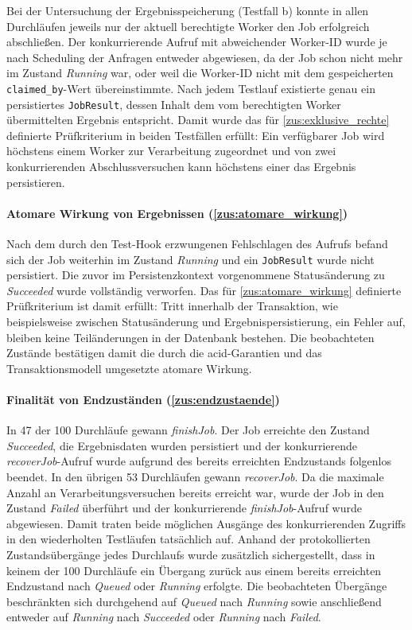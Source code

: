 Bei der Untersuchung der Ergebnisspeicherung (Testfall b) konnte in allen Durchläufen jeweils nur der aktuell
berechtigte Worker den Job erfolgreich abschließen.
Der konkurrierende Aufruf mit abweichender Worker-ID wurde je nach Scheduling der Anfragen entweder abgewiesen, da der
Job schon nicht mehr im Zustand \textit{Running} war, oder weil die Worker-ID nicht mit dem gespeicherten
\texttt{claimed\_by}-Wert übereinstimmte.
Nach jedem Testlauf existierte genau ein persistiertes \texttt{JobResult}, dessen Inhalt dem vom berechtigten Worker
übermittelten Ergebnis entspricht.
Damit wurde das für \ref{zus:exklusive_rechte} definierte Prüfkriterium in beiden Testfällen erfüllt: Ein
verfügbarer Job wird höchstens einem Worker zur Verarbeitung zugeordnet und von zwei konkurrierenden Abschlussversuchen
kann höchstens einer das Ergebnis persistieren.

\paragraph{Atomare Wirkung von Ergebnissen (\ref{zus:atomare_wirkung})}
\label{erg:atomare_wirkung}
Nach dem durch den Test-Hook erzwungenen Fehlschlagen des Aufrufs befand sich der Job weiterhin im Zustand
\textit{Running} und ein \texttt{JobResult} wurde nicht persistiert.
Die zuvor im Persistenzkontext vorgenommene Statusänderung zu \textit{Succeeded} wurde vollständig verworfen.
Das für \ref{zus:atomare_wirkung} definierte Prüfkriterium ist damit erfüllt: Tritt innerhalb der Transaktion, wie beispielsweise
zwischen Statusänderung und Ergebnispersistierung, ein Fehler auf, bleiben keine Teiländerungen in der Datenbank bestehen.
Die beobachteten Zustände bestätigen damit die durch die \gls{acid}-Garantien und das Transaktionsmodell umgesetzte atomare Wirkung.

\paragraph{Finalität von Endzuständen (\ref{zus:endzustaende})}
\label{erg:endzustaende}
In 47 der 100 Durchläufe gewann \textit{finishJob}.
Der Job erreichte den Zustand \textit{Succeeded}, die Ergebnisdaten wurden persistiert und der konkurrierende
\textit{recoverJob}-Aufruf wurde aufgrund des bereits erreichten Endzustands folgenlos beendet.
In den übrigen 53 Durchläufen gewann \textit{recoverJob}.
Da die maximale Anzahl an Verarbeitungsversuchen bereits erreicht war, wurde der Job in den Zustand \textit{Failed} überführt
und der konkurrierende \textit{finishJob}-Aufruf wurde abgewiesen.
Damit traten beide möglichen Ausgänge des konkurrierenden Zugriffs in den wiederholten Testläufen tatsächlich auf.
Anhand der protokollierten Zustandsübergänge jedes Durchlaufs wurde zusätzlich sichergestellt, dass in keinem der
100 Durchläufe ein Übergang zurück aus einem bereits erreichten Endzustand nach \textit{Queued} oder \textit{Running} erfolgte.
Die beobachteten Übergänge beschränkten sich durchgehend auf \textit{Queued} nach \textit{Running} sowie
anschließend entweder auf \textit{Running} nach \textit{Succeeded} oder \textit{Running} nach \textit{Failed}.

